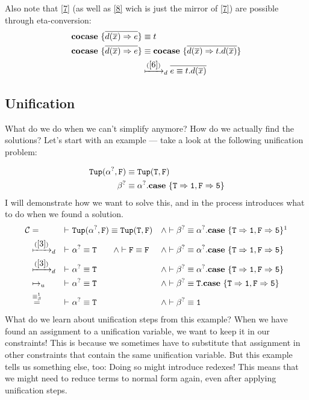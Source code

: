\documentclass[twoside,12pt,a4paper]{article}
\begin{document}
Also note that \cref{7} (as well as \cref{8} wich is just the mirror of \cref{7}) are possible through eta-conversion:
\begin{align*}
    \excopatmatch{\overline{d(\overline{x})\Rightarrow e}}&\equiv t \\
    \excopatmatch{\overline{d(\overline{x})\Rightarrow e}}&\equiv \excopatmatch{\overline{d(\overline{x})\Rightarrow t.d(\overline{x})}}\\
    &\xmapsto{(\cref{6})}_d \overline{e \equiv t.d(\overline{x})}
\end{align*}

\subsection{Unification}

What do we do when we can't simplify anymore? How do we actually find the solutions?
Let's start with an example --- take a look at the following unification problem:
\begin{example}[Unification]
    \begin{align*}
        \mathtt{Tup(\alpha^?, F)}&\equiv \mathtt{Tup(T, F)}\\
        \beta^?&\equiv \alpha^?.\textbf{case}\ \{\mathtt{T \Rightarrow 1, F\Rightarrow 5}\}
    \end{align*}        
    I will demonstrate how we want to solve this, and in the process introduces what to do when we found a solution.   
    \begin{align*}
        \constraints &= &\vdash\ & \mathtt{Tup(\alphaunifvar, F)}\equiv \mathtt{Tup(T, F)}&\wedge&
        \vdash \betaunifvar\equiv \alphaunifvar.\expatmatch{\mathtt{T \Rightarrow 1, F\Rightarrow 5}}\footnotemark[1]\\
        &\xmapsto{(\cref{3})}_d &\vdash\ & \mathtt{\alphaunifvar\equiv T}\qquad\wedge\vdash \mathtt{F\equiv F} &\wedge& 
        \vdash \betaunifvar\equiv \alphaunifvar.\expatmatch{\mathtt{T \Rightarrow 1, F\Rightarrow 5}}\\
        &\xmapsto{(\cref{3})}_d &\vdash\ & \mathtt{\alphaunifvar\equiv T} &\wedge& 
        \vdash \betaunifvar\equiv \alphaunifvar.\expatmatch{\mathtt{T \Rightarrow 1, F\Rightarrow 5}}\\
        &\mapsto_u &\vdash\ &\mathtt{\alphaunifvar\equiv T} &\wedge&
        \vdash \betaunifvar\equiv \mathtt{T}.\expatmatch{\mathtt{T \Rightarrow 1, F\Rightarrow 5}}\\
        &\stackrel{\betaconv}{=} &\vdash\ &\mathtt{\alphaunifvar\equiv T} &\wedge&
        \vdash \betaunifvar\equiv \mathtt{1}
    \end{align*}
What do we learn about unification steps from this example? When we have found an assignment to a unification variable, we want to keep it in our constraints!
This is because we sometimes have to substitute that assignment in other constraints that contain the same unification variable.
But this example tells us something else, too: Doing so might introduce redexes!
This means that we might need to reduce terms to normal form again, even after applying unification steps. 
\end{example}
\end{document}
